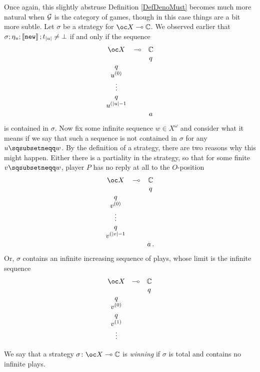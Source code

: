 Once again, this slightly abstruse Definition \ref{DefDenoMust} becomes much more natural when $\mathcal G$ is the category of games, though in this case things are a bit more subtle.  
Let $\sigma$ be a strategy for $\oc X \implies \bC$.  
We observed earlier that $\sigma;\eta_u;\left\llbracket{\mathtt{new}}\right\rrbracket;t_{|u|}\neq\bot$ if and only if the sequence
\[
  \begin{array}{ccc}
    \oc X       & \implies & \bC \\
                &          &  q  \\
      q         &          &     \\
    u^{(0)}     &          &     \\
    \vdots      &          &     \\
      q         &          &     \\
   u^{(|u|-1}   &          &     \\
                &          &  a
  \end{array}
  \]
is contained in $\sigma$.  
Now fix some infinite sequence $w\in X^\omega$ and consider what it means if we say that such a sequence is not contained in $\sigma$ for any $u\pprefix w$.  
By the definition of a strategy, there are two reasons why this might happen.  
Either there is a partiality in the strategy, so that for some finite $v\pprefix w$, player $P$ has no reply at all to the $O$-position
\[
  \begin{array}{ccc}
    \oc X       & \implies & \bC \\
                &          &  q  \\
      q         &          &     \\
    v^{(0)}     &          &     \\
    \vdots      &          &     \\
      q         &          &     \\
   v^{(|v|-1}   &          &     \\
                &          & {a\,.}
  \end{array}
  \]
Or, $\sigma$ contains an infinite increasing sequence of plays, whose limit is the infinite sequence
\[
  \begin{array}{ccc}
    \oc X       & \implies & \bC \\
                &          &  q  \\
      q         &          &     \\
    v^{(0)}     &          &     \\
      q         &          &     \\
    v^{(1)}     &          &     \\
    \vdots      &          &     
  \end{array}
  \]
\begin{definition}
  We say that a strategy $\sigma\from \oc X \implies \bC$ is \emph{winning} if $\sigma$ is total and contains no infinite plays.
\end{definition}

